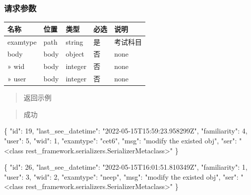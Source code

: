 \documentclass[
]{article}
\newenvironment{Shaded}{}{}
\newcommand{\DataTypeTok}[1]{\textcolor[rgb]{0.56,0.13,0.00}{#1}}
\newcommand{\DecValTok}[1]{\textcolor[rgb]{0.25,0.63,0.44}{#1}}
\newcommand{\FunctionTok}[1]{\textcolor[rgb]{0.02,0.16,0.49}{#1}}
\newcommand{\StringTok}[1]{\textcolor[rgb]{0.25,0.44,0.63}{#1}}
\begin{document}
\hypertarget{ux8bf7ux6c42ux53c2ux6570-17}{%
\subsubsection{请求参数}\label{ux8bf7ux6c42ux53c2ux6570-17}}

\begin{longtable}[]{@{}lllll@{}}
\toprule
名称 & 位置 & 类型 & 必选 & 说明 \\
\midrule
\endhead
examtype & path & string & 是 & 考试科目 \\
body & body & object & 否 & none \\
» wid & body & integer & 否 & none \\
» user & body & integer & 否 & none \\
\bottomrule
\end{longtable}

\begin{quote}
返回示例
\end{quote}

\begin{quote}
成功
\end{quote}

\begin{Shaded}
\begin{Highlighting}[]
\FunctionTok{\{}
  \DataTypeTok{"id"}\FunctionTok{:} \DecValTok{19}\FunctionTok{,}
  \DataTypeTok{"last\_see\_datetime"}\FunctionTok{:} \StringTok{"2022{-}05{-}15T15:59:23.958299Z"}\FunctionTok{,}
  \DataTypeTok{"familiarity"}\FunctionTok{:} \DecValTok{4}\FunctionTok{,}
  \DataTypeTok{"user"}\FunctionTok{:} \DecValTok{5}\FunctionTok{,}
  \DataTypeTok{"wid"}\FunctionTok{:} \DecValTok{1}\FunctionTok{,}
  \DataTypeTok{"examtype"}\FunctionTok{:} \StringTok{"cet6"}\FunctionTok{,}
  \DataTypeTok{"msg"}\FunctionTok{:} \StringTok{"modify the existed obj"}\FunctionTok{,}
  \DataTypeTok{"ser"}\FunctionTok{:} \StringTok{"\textless{}class \textquotesingle{}rest\_framework.serializers.SerializerMetaclass\textquotesingle{}\textgreater{}"}
\FunctionTok{\}}
\end{Highlighting}
\end{Shaded}

\begin{Shaded}
\begin{Highlighting}[]
\FunctionTok{\{}
  \DataTypeTok{"id"}\FunctionTok{:} \DecValTok{26}\FunctionTok{,}
  \DataTypeTok{"last\_see\_datetime"}\FunctionTok{:} \StringTok{"2022{-}05{-}15T16:01:51.810349Z"}\FunctionTok{,}
  \DataTypeTok{"familiarity"}\FunctionTok{:} \DecValTok{1}\FunctionTok{,}
  \DataTypeTok{"user"}\FunctionTok{:} \DecValTok{3}\FunctionTok{,}
  \DataTypeTok{"wid"}\FunctionTok{:} \DecValTok{2}\FunctionTok{,}
  \DataTypeTok{"examtype"}\FunctionTok{:} \StringTok{"neep"}\FunctionTok{,}
  \DataTypeTok{"msg"}\FunctionTok{:} \StringTok{"modify the existed obj"}\FunctionTok{,}
  \DataTypeTok{"ser"}\FunctionTok{:} \StringTok{"\textless{}class \textquotesingle{}rest\_framework.serializers.SerializerMetaclass\textquotesingle{}\textgreater{}"}
\FunctionTok{\}}
\end{Highlighting}
\end{Shaded}
\end{document}
